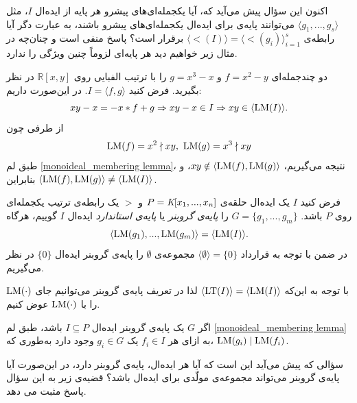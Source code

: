 
اکنون این سؤال پیش می‌آید که، آیا یکجمله‌ای‌های  پیشرو هر پایه از ایده‌ال 
$I$، 
مثل 
$\langle g_{1},...,g_{s} \rangle$
می‌توانند پایه‌ی برای ایده‌ال یکجمله‌ای‌های  پیشرو باشند، به عبارت دگر آیا رابطه‌ی 
$\langle\lt(I)\rangle = \langle \lt(g_{i})\rangle_{i = 1}^{s}$
برقرار است؟  پاسخ منفی است و چنان‌چه در مثال زیر خواهیم دید هر پایه‌‌ای لزوماً چنین ویژگی‌ را ندارد. 

\begin{example}
	\label{basis that not grobner basis example}
دو چندجمله‌ای 
$f = x^{2} - y$
و
$g = x^{3} - x$
را با ترتیب الفبایی روی 
$\mathbb{R}[x,y]$
در نظر بگیرید. فرض کنید 
$I = \langle f, g\rangle$.
در این‌صورت داریم:
$$xy - x = -x*f + g\Rightarrow xy - x\in I \Rightarrow xy\in\langle \operatorname{\mathrm{LM}}(I)\rangle.$$
از طرفی چون
$$\operatorname{\mathrm{LM}}(f) = x^{2}\nmid xy, \ \operatorname{\mathrm{LM}}(g) = x^{3}\nmid xy$$
طبق لم
\ref{monoideal_membering lemma}،
نتیجه می‌گیریم، 
$xy\notin \langle \operatorname{\mathrm{LM}}(f), \operatorname{\mathrm{LM}}(g)\rangle$، 
و بنابراین
$\langle \operatorname{\mathrm{LM}}(f), \operatorname{\mathrm{LM}}(g)\rangle \neq \langle \operatorname{\mathrm{LM}}(I)\rangle$.
\end{example}

\begin{definition}
\cite{IVAcox}
فرض کنید 
$I$
یک ایده‌ال حلقه‌ی 
$P = \textit{K}[x_{1},...,x_{n}]$
و 
$>$
یک رابطه‌ی ترتیب یکجمله‌ای روی 
$P$
باشد.
$G = \{g_{1},...,g_{m}\}$
را
\textit{پایه‌ی گروبنر}
یا 
\textit{پایه‌ی استاندارد}
ایده‌ال 
$I$
گوییم، هر‌گاه
$$\langle\operatorname{\mathrm{LM}}(g_{1}),...,\operatorname{\mathrm{LM}}(g_{m})\rangle = \langle \operatorname{\mathrm{LM}}(I)\rangle.$$
در ضمن با توجه به قرارداد 
$\langle\emptyset\rangle = \{0\}$
مجموعه‌ی 
$\emptyset$
را پایه‌ی گروبنر ایده‌ال 
$\{0\}$
 در نظر می‌گیریم. 
\end{definition}

با توجه به این‌که 
$\langle\operatorname{\mathrm{LT}}(I)\rangle = \langle\operatorname{\mathrm{LM}}(I)\rangle$
لذا در تعریف پایه‌ی گروبنر می‌توانیم جای 
$\operatorname{\mathrm{LM}}(\cdot)$
را با 
$\operatorname{\mathrm{LM}}(\cdot)$
عوض کنیم.

\begin{corollary}
	اگر 
	$G$
یک پایه‌ی گروبنر ایده‌ال 
$I\subseteq P$
باشد، طبق لم 
\ref{monoideal_membering lemma}
به ازای هر 
$f_{i}\in I$
یک 
$g_{i}\in G$
وجود دارد به‌طوری که،
$\operatorname{\mathrm{LM}}(g_{i})\mid\operatorname{\mathrm{LM}}(f_{i})$.

\end{corollary}
سؤالی که پیش می‌آید این است که آیا هر ایده‌ال، پایه‌ی گروبنر دارد، در این‌صورت آیا پایه‌ی گروبنر می‌تواند مجموعه‌ی مولّدی برای ایده‌ال باشد؟ قضیه‌ی زیر به این سؤال پاسخ مثبت می دهد.

